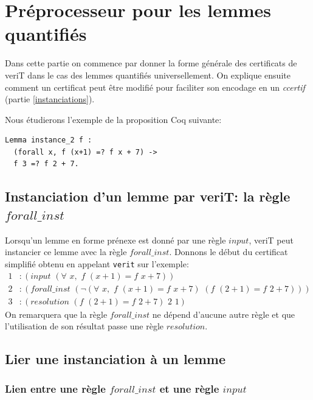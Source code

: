 \documentclass[11pt]{article}
\begin{document}
\section{Préprocesseur pour les lemmes quantifiés}

Dans cette partie on commence par donner la forme générale des certificats de veriT dans le cas des lemmes quantifiés universellement. On explique ensuite comment un certificat peut être modifié pour faciliter son encodage en un \textit{ccertif} (partie \ref{instanciations}).\medbreak

Nous étudierons l'exemple de la proposition Coq suivante: 

\begin{lstlisting}[frame=single]
Lemma instance_2 f : 
  (forall x, f (x+1) =? f x + 7) ->
  f 3 =? f 2 + 7.
\end{lstlisting}


\subsection{Instanciation d'un lemme par veriT: la règle $forall\_inst$}

Lorsqu'un lemme en forme prénexe est donné par une règle $input$, veriT peut instancier ce lemme avec la règle $forall\_inst$. Donnons le début du certificat simplifié obtenu en appelant \texttt{verit} sur l'exemple:
\begin{align*}
1&:(input \,\,(\forall\,\, x,\,\, f\,\, (x+1) = f\,\,x+7)) \\
2&:(forall\_inst \,\,(\neg (\forall\,\, x, \,\,f \,\,(x+1) = f\,\,x+7) \,\,(f \,\,(2+1) = f\,\,2+7)) )\\
3&:(resolution  \,\, (f \,\,(2+1) = f\,\,2+7) \,\,2 \,\,1) 
\end{align*}
On remarquera que la règle $forall\_inst$ ne dépend d'aucune autre règle et que l'utilisation de son résultat passe une règle $resolution$.

\subsection{Lier une instanciation à un lemme} \label{lien}

\subsubsection{Lien entre une règle $forall\_inst$ et une règle $input$} \label{lien_parsing}
\end{document}
